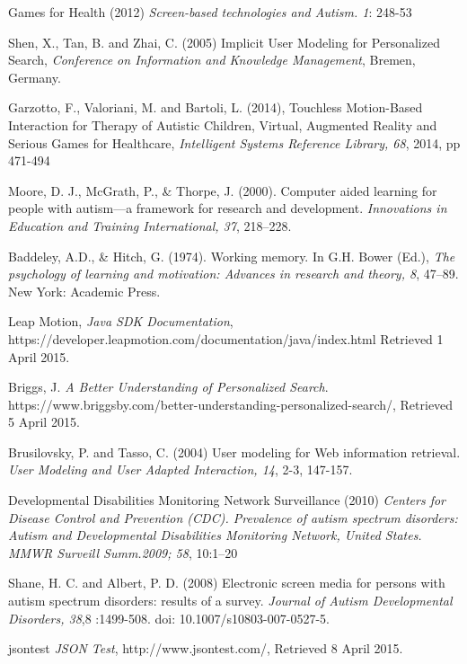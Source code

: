 \documentclass[a4paper, 11pt]{article}
\begin{document}
\clearpage
\begin{thebibliography}{100}

 Games for Health (2012) \textit{Screen-based technologies and Autism. 1}: 248-53

Shen, X., Tan, B. and Zhai, C. (2005) Implicit User Modeling for Personalized Search, \textit{Conference on Information and Knowledge Management}, Bremen, Germany.

 Garzotto, F., Valoriani, M. and Bartoli, L. (2014), Touchless Motion-Based Interaction for Therapy of Autistic Children, Virtual, Augmented Reality and Serious Games for Healthcare, \textit{Intelligent Systems Reference Library, 68}, 2014, pp 471-494

Moore, D. J., McGrath, P., \& Thorpe, J. (2000). Computer aided learning for people with autism—a framework for research and development. \textit{Innovations in Education and Training International, 37}, 218–228.

Baddeley, A.D., \& Hitch, G. (1974). Working memory. In G.H. Bower (Ed.), \textit{The psychology of learning and motivation: Advances in research and theory, 8}, 47–89. New York: Academic Press.

 Leap Motion, \textit{Java SDK Documentation}, https://developer.leapmotion.com/documentation/java/index.html Retrieved 1 April 2015.

Briggs, J. \textit{A Better Understanding of Personalized Search}. https://www.briggsby.com/better-understanding-personalized-search/, Retrieved 5 April 2015.

 Brusilovsky, P. and Tasso, C. (2004) User modeling for Web information retrieval. \textit{User Modeling and User Adapted Interaction, 14}, 2-3, 147-157.


Developmental Disabilities Monitoring Network Surveillance (2010) \textit{Centers for Disease Control and Prevention (CDC). Prevalence of autism spectrum disorders: Autism and Developmental Disabilities Monitoring Network, United States. MMWR Surveill Summ.2009; 58}, 10:1–20


Shane, H. C. and Albert, P. D. (2008) Electronic screen media for persons with autism spectrum disorders: results of a survey. \textit{Journal of Autism Developmental Disorders, 38},8 :1499-508. doi: 10.1007/s10803-007-0527-5.


jsontest \textit{JSON Test}, http://www.jsontest.com/, Retrieved 8 April 2015.


\end{thebibliography}
\end{document}
